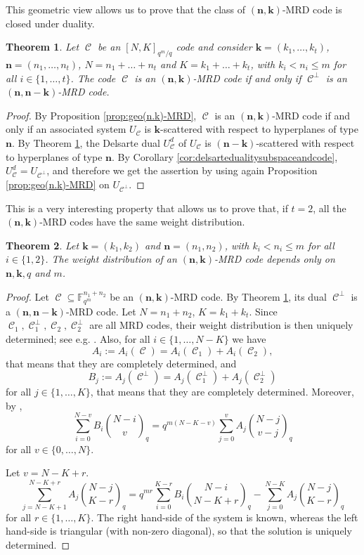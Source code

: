 \documentclass[11pt]{amsart}
\DeclareMathOperator{\C}{\mathcal{C}}
\newtheorem{theorem}{Theorem}[section]
\newcommand{\F}{{\mathbb F}}
\begin{document}
This geometric view allows us to prove that the class of $(\mathbf{n},\mathbf{k})$-MRD code is closed under duality.

\begin{theorem}\label{thm:dual(n,k)MRD}
    Let $\C$ be an $[N,K]_{q^m/q}$ code and consider ${\mathbf k}=(k_1,\ldots,k_t)$, ${\mathbf n}=(n_1,\ldots,n_t)$, $N=n_1+\ldots+n_t$ and $K=k_1+\ldots+k_t$, with $k_i<n_i\leq m$ for all $i\in \{1,\ldots,t\}$. 
    The code $\C$ is an $(\mathbf{n},\mathbf{k})$-MRD code if and only if $\C^\perp$ is an $(\mathbf{n},\mathbf{n}-\mathbf{k})$-MRD code.
\end{theorem}
\begin{proof}
    By Proposition \ref{prop:geo(n.k)-MRD}, $\C$ is an $(\mathbf{n},\mathbf{k})$-MRD code if and only if an associated system $U_{\C}$ is $\mathbf{k}$-scattered with respect to hyperplanes of type $\mathbf{n}$.
    By Theorem \ref{thm:dual(n,k)MRD}, the Delsarte dual $U_{\C}^d$ of $U_{\C}$ is $(\mathbf{n}-\mathbf{k})$-scattered with respect to hyperplanes of type $\mathbf{n}$. By Corollary \ref{cor:delsartedualitysubspaceandcode}, $U_{\C}^d=U_{\C^\perp}$, and therefore we get the assertion by using again Proposition \ref{prop:geo(n.k)-MRD} on $U_{\C^\perp}$.
\end{proof}


This is a very interesting property that allows us to prove that, if $t=2$, all the $(\mathbf{n},\mathbf{k})$-MRD codes have the same weight distribution. 

\begin{theorem}\label{thm:weightdistribution}
Let ${\mathbf k}=(k_1,k_2)$ and  ${\mathbf n}=(n_1,n_2)$, with $k_i<n_i\leq m$ for all $i\in \{1,2\}$. The weight distribution of an $(\mathbf{n},\mathbf{k})$-MRD code depends only on $\mathbf{n},\mathbf{k},q$ and $m$.
\end{theorem}
\begin{proof}
Let $\C\subseteq \F_{q^m}^{n_1+n_2}$ be an $(\mathbf{n},\mathbf{k})$-MRD code. By Theorem \ref{thm:dual(n,k)MRD}, its dual $\C^\perp$ is a $(\mathbf{n},\mathbf{n}-\mathbf{k})$-MRD code. Let $N=n_1+n_2$, $K=k_1+k_t$.
Since $\C_1, \C_1^\perp,\C_2,\C_2^\perp$ are all MRD codes, their weight distribution is then uniquely determined; see e.g. \cite[Remark 45]{ravagnani2016rank}. 
Also,  for all $i\in \{1,\ldots,N-K\}$ we have 
$$A_i:=A_i(\C)=A_i(\C_1)+A_i(\C_2),$$
 that means that they are completely determined,
and 
$$B_j:=A_j(\C^\perp)=A_j(\C_1^\perp)+A_j(\C_2^\perp)$$
for all $j\in \{1,\ldots,K\}$, that means that they are completely determined.
 Moreover, by \cite[Proposition 4.]{gadouleau2008macwilliams}, $$\sum_{i=0}^{N-v}B_i\binom{N-i}{v}_q=q^{m(N-K-v)}\sum_{j=0}^vA_j\binom{N-j}{v-j}_q$$
for all $v\in\{0,\ldots,N\}$. 

Let $v=N-K+r$. 
$$\sum_{j=N-K+1}^{N-K+r}A_j\binom{N-j}{K-r}_q
=q^{mr}\sum_{i=0}^{K-r}B_i\binom{N-i}{N-K+r}_q-\sum_{j=0}^{N-K}A_j\binom{N-j}{K-r}_q$$
for all $r\in \{1,\ldots,K\}$. The right hand-side of the system is known, whereas the left hand-side is triangular (with non-zero diagonal), so that the solution is uniquely determined.
\end{proof}
\end{document}
